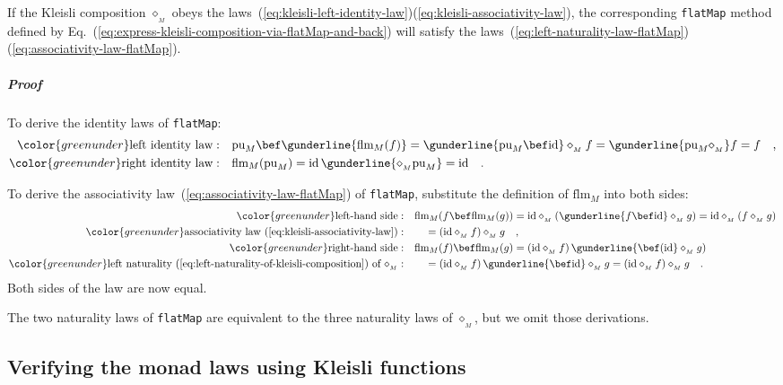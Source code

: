 If the Kleisli composition $\diamond_{_{M}}$ obeys the laws~(\ref{eq:kleisli-left-identity-law})\textendash (\ref{eq:kleisli-associativity-law}),
the corresponding \lstinline!flatMap! method defined by Eq.~(\ref{eq:express-kleisli-composition-via-flatMap-and-back})
will satisfy the laws~(\ref{eq:left-naturality-law-flatMap})\textendash (\ref{eq:associativity-law-flatMap}).

\subparagraph{Proof}

To derive the identity laws of \lstinline!flatMap!:
\begin{align*}
{\color{greenunder}\text{left identity law}:}\quad & \text{pu}_{M}\bef\gunderline{\text{flm}_{M}(f)}=\gunderline{\text{pu}_{M}\bef\text{id}}\diamond_{_{M}}f=\gunderline{\text{pu}_{M}\diamond_{_{M}}}f=f\quad,\\
{\color{greenunder}\text{right identity law}:}\quad & \text{flm}_{M}(\text{pu}_{M})=\text{id}\,\gunderline{\diamond_{_{M}}\text{pu}_{M}}=\text{id}\quad.
\end{align*}

To derive the associativity law~(\ref{eq:associativity-law-flatMap})
of \lstinline!flatMap!, substitute the definition of $\text{flm}_{M}$
into both sides:
\begin{align*}
{\color{greenunder}\text{left-hand side}:}\quad & \text{flm}_{M}(f\bef\text{flm}_{M}(g))=\text{id}\diamond_{_{M}}(\gunderline{f\bef\text{id}}\diamond_{_{M}}g)=\text{id}\diamond_{_{M}}(f\diamond_{_{M}}g)\\
{\color{greenunder}\text{associativity law~(\ref{eq:kleisli-associativity-law})}:}\quad & \quad=(\text{id}\diamond_{_{M}}f)\diamond_{_{M}}g\quad,\\
{\color{greenunder}\text{right-hand side}:}\quad & \text{flm}_{M}(f)\bef\text{flm}_{M}(g)=(\text{id}\diamond_{_{M}}f)\,\gunderline{\bef(\text{id}}\diamond_{_{M}}g)\\
{\color{greenunder}\text{left naturality~(\ref{eq:left-naturality-of-kleisli-composition}) of }\diamond_{_{M}}:}\quad & \quad=(\text{id}\diamond_{_{M}}f)\,\gunderline{\bef\text{id}}\diamond_{_{M}}g=(\text{id}\diamond_{_{M}}f)\diamond_{_{M}}g\quad.
\end{align*}
Both sides of the law are now equal.

The two naturality laws of \lstinline!flatMap! are equivalent to
the three naturality laws of $\diamond_{_{M}}$, but we omit those
derivations. 

\subsection{Verifying the monad laws using Kleisli functions}

